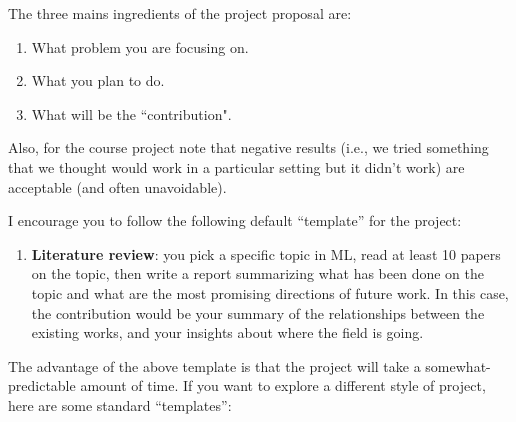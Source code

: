 \documentclass{article}
\def\blu#1{{\color{blu}#1}}
\def\enum#1{\begin{enumerate}#1\end{enumerate}}
\begin{document}
\blu{The three mains ingredients of the project proposal are:
\begin{enumerate}
\item What problem you are focusing on.
\item What you plan to do.
\item What will be the ``contribution".
\end{enumerate}
}
Also, for the course project note that negative results (i.e., we tried something that we thought would work in a particular setting but it didn't work) are acceptable (and often unavoidable).

I encourage you to follow the following default ``template'' for the project:
\enum{
\item \textbf{Literature review}: you pick a specific topic in ML, read at least 10 papers on the topic, then write a report summarizing what has been done on the topic and what are the most promising directions of future work. In this case, the contribution would be your summary of the relationships between the existing works, and your insights about where the field is going.
}
The advantage of the above template is that the project will take a somewhat-predictable amount of time. If you want to explore a different style of project, here are some standard ``templates'':
\end{document}
